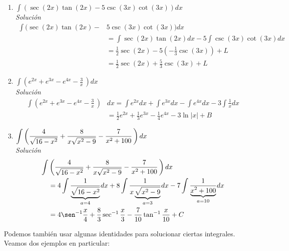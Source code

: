 \begin{enumerate}[leftmargin=1.2em,   itemindent=0pt,       labelwidth=\labelwidth,labelsep=0.5em,]
\item $\displaystyle \int (\sec (2x)\tan (2x)-5\csc (3x)\cot (3x))dx$ \\%

\textit{Solución}
{\small
\begin{align*}
\int (\sec (2x)\tan (2x)-&5\csc (3x)\cot (3x))dx\\
&=\int \sec (2x)\tan (2x)dx - 5\int \csc (3x)\cot (3x)dx\\
&=\frac{1}{2}\sec (2x)-5\left(-\frac{1}{3}\csc (3x)\right)+L\\
&=\frac{1}{2}\sec (2x)+\frac{5}{3}\csc (3x)+L
\end{align*}
}

\item $\displaystyle \int \left(e^{2x}+e^{3x}-e^{4x}-\frac{3}{x}\,\right)dx$ \\%

\textit{Solución}
{\small
\begin{align*}
\int \left(e^{2x}+e^{3x}-e^{4x}-\frac{3}{x}\,\right)&dx=\int e^{2x}dx+\int e^{3x}dx-\int e^{4x}dx-3\int \frac{1}{x}dx\\
&=\frac{1}{2}e^{2x}+\frac{1}{3}e^{3x}-\frac{1}{4}e^{4x}-3\ln |x|+B
\end{align*}
}

\item $\displaystyle \int\left( \frac{4}{\sqrt{16-x^{2}}}+\frac{8}{x\sqrt{x^{2}-9}}-\frac{7}{%
x^{2}+100}\,\right)dx$ \\%

\textit{Solución}
\begin{align*}
\int&\left( \frac{4}{\sqrt{16-x^{2}}}+\frac{8}{x\sqrt{x^{2}-9}}-\frac{7}{%
x^{2}+100}\,\right)dx\\
&= 4\int \frac{1}{\underbrace{\sqrt{16-x^{2}}}_{a=4}}dx+8\int \frac{1}{x\underbrace{\sqrt{x^{2}-9}}_{a=3}}dx-7\int
\frac{1}{\underbrace{x^{2}+100}_{a=10}}dx\\
&=4\sen^{-1} \frac{x}{4}+\frac{8}{3}\sec^{-1}\frac{x}{3}-\frac{7}{10}%
\tan^{-1} \frac{x}{10}+C 
\end{align*}
\end{enumerate}

\begin{ejemplo}
\textnormal{Podemos también usar algunas identidades para solucionar ciertas integrales. Veamos dos ejemplos en particular:}
\end{ejemplo}

